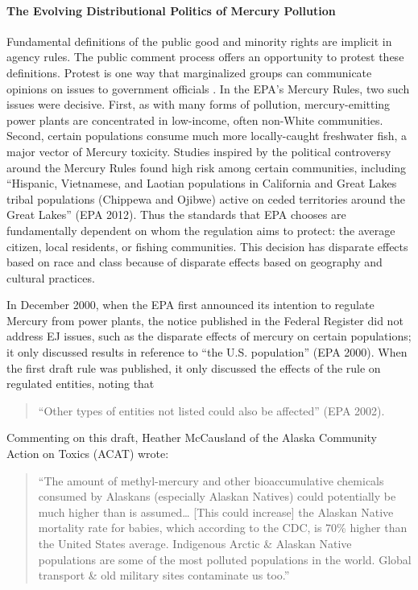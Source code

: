 \documentclass[
      12pt,
        ]{article}
\begin{document}
\hypertarget{the-evolving-distributional-politics-of-mercury-pollution}{%
\paragraph{The Evolving Distributional Politics of Mercury Pollution}\label{the-evolving-distributional-politics-of-mercury-pollution}}

Fundamental definitions of the public good and minority rights are
implicit in agency rules. The public comment process offers an
opportunity to protest these definitions. Protest is one way that
marginalized groups can communicate opinions on issues to government
officials \citep{Gillion2013}. In the EPA's Mercury Rules, two
such issues were decisive. First, as with many forms of pollution,
mercury-emitting power plants are concentrated in low-income, often
non-White communities. Second, certain populations consume much more
locally-caught freshwater fish, a major vector of Mercury toxicity.
Studies inspired by the political controversy around the Mercury Rules
found high risk among certain communities, including ``Hispanic, Vietnamese, and
Laotian populations in California and Great Lakes tribal populations
(Chippewa and Ojibwe) active on ceded territories around the Great
Lakes'' (EPA 2012). Thus the standards that EPA chooses are fundamentally
dependent on whom the regulation aims to protect: the average citizen,
local residents, or fishing communities. This decision has disparate
effects based on race and class because of disparate effects based on
geography and cultural practices.

In December 2000, when the EPA first announced its intention to regulate
Mercury from power plants, the notice published in the Federal Register
did not address EJ issues, such as the disparate
effects of mercury on certain populations; it only discussed results in
reference to ``the U.S. population'' (EPA 2000). When the first draft rule
was published, it only discussed the effects of the rule on regulated
entities, noting that

\begin{quote}
``Other types of entities not listed could also be
affected'' (EPA 2002).
\end{quote}

Commenting on this draft, Heather McCausland of
the Alaska Community Action on Toxics (ACAT) wrote:

\begin{quote}
``The amount of methyl-mercury and other bioaccumulative chemicals
consumed by Alaskans (especially Alaskan Natives) could potentially be
much higher than is assumed\ldots{} {[}This could increase{]} the Alaskan Native mortality rate for
babies, which according to the CDC, is 70\% higher than the United States
average. Indigenous Arctic \& Alaskan Native populations are some of
the most polluted populations in the world.
Global transport \& old military sites contaminate us too.''
\end{quote}
\end{document}
